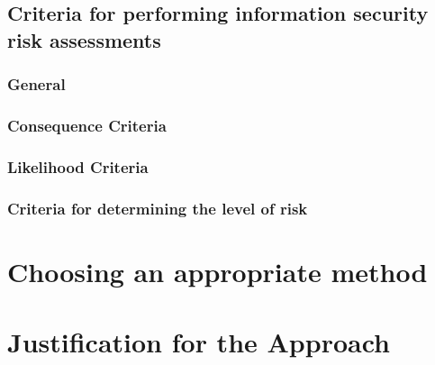 
\subsection{Criteria for performing information security risk assessments}

\pagebreak

\subsubsection{General}

\subsubsection{Consequence Criteria}

\subsubsection{Likelihood Criteria}

\subsubsection{Criteria for determining the level of risk}

\section{Choosing an appropriate method}

\section{Justification for the Approach}
